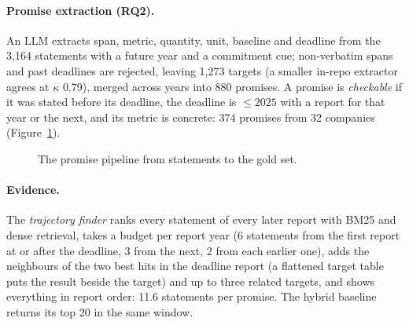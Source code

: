 \documentclass[11pt]{article}
\newcommand{\kappaval}{$\kappa$}
\begin{document}
\paragraph{Promise extraction (RQ2).}
\label{sec:promises}
An LLM extracts span, metric, quantity, unit, baseline and deadline from the 3,164 statements with a future year and a commitment cue; non-verbatim spans and past deadlines are rejected, leaving 1,273 targets (a smaller in-repo extractor agrees at \kappaval{} 0.79), merged across years into 880 promises. A promise is \emph{checkable} if it was stated before its deadline, the deadline is $\le 2025$ with a report for that year or the next, and its metric is concrete: 374 promises from 32 companies (Figure~\ref{fig:funnel}).

\begin{figure}[t]
\centering
{}
\caption{The promise pipeline from statements to the gold set.}
\label{fig:funnel}
\end{figure}


\paragraph{Evidence.}
\label{sec:rq2-evidence}
The \emph{trajectory finder} ranks every statement of every later report with BM25 and dense retrieval, takes a budget per report year (6 statements from the first report at or after the deadline, 3 from the next, 2 from each earlier one), adds the neighbours of the two best hits in the deadline report (a flattened target table puts the result beside the target) and up to three related targets, and shows everything in report order: 11.6 statements per promise. The hybrid baseline returns its top 20 in the same window.
\end{document}
